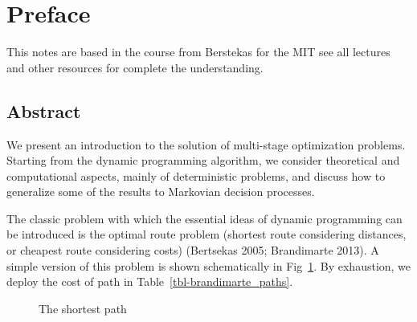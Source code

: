 \documentclass[
  letterpaper,
  DIV=11,
  numbers=noendperiod]{scrreprt}
\author{Saúl Díaz Infante, David González Sánchez}
\date{2024-05-30}
\renewcommand*\contentsname{Table of contents}
\newcommand\contentsname{Table of contents}
\theoremstyle{definition}
\theoremstyle{remark}
\begin{document}
\renewcommand*\contentsname{Table of contents}
{
\hypersetup{linkcolor=}
\setcounter{tocdepth}{2}
\tableofcontents
}

\chapter*{Preface}\label{preface}


This notes are based in the course from Berstekas for the MIT see all
lectures and other resources for complete the understanding.

\section*{Abstract}\label{abstract}


We present an introduction to the solution of multi-stage optimization
problems. Starting from the dynamic programming algorithm, we consider
theoretical and computational aspects, mainly of deterministic problems,
and discuss how to generalize some of the results to Markovian decision
processes.

The classic problem with which the essential ideas of dynamic
programming can be introduced is the optimal route problem (shortest
route considering distances, or cheapest route considering costs)
(Bertsekas 2005; Brandimarte 2013). A simple version of this problem is
shown schematically in Fig~\ref{fig-brandimarte_net}. By exhaustion, we
deploy the cost of path in Table~\ref{tbl-brandimarte_paths}.

\begin{figure}


\caption{\label{fig-brandimarte_net}The shortest path}

\end{figure}%
\end{document}
